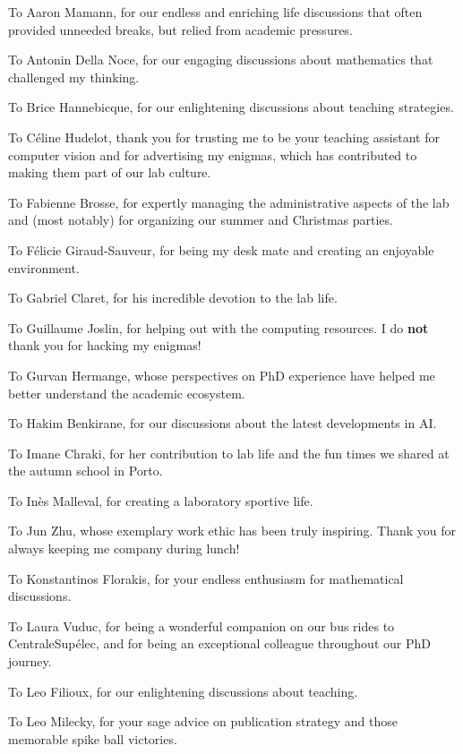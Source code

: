 To Aaron Mamann, for our endless and enriching life discussions that often provided unneeded breaks, but relied from academic pressures.


To Antonin Della Noce, for our engaging discussions about mathematics that challenged my thinking.

To Brice Hannebicque, for our enlightening discussions about teaching strategies.

To Céline Hudelot, thank you for trusting me to be your teaching assistant for computer vision and for advertising my enigmas, which has contributed to making them part of our lab culture.

To Fabienne Brosse, for expertly managing the administrative aspects of the lab and (most notably) for organizing our summer and Christmas parties.

To Félicie Giraud-Sauveur, for being my desk mate and creating an enjoyable environment.

To Gabriel Claret, for his incredible devotion to the lab life.

To Guillaume Joslin, for helping out with the computing resources.
I do \textbf{not} thank you for hacking my enigmas!

To Gurvan Hermange, whose perspectives on PhD experience have helped me better understand the academic ecosystem.

To Hakim Benkirane, for our discussions about the latest developments in AI.

To Imane Chraki, for her contribution to lab life and the fun times we shared at the autumn school in Porto.

To Inès Malleval, for creating a laboratory sportive life.

To Jun Zhu, whose exemplary work ethic has been truly inspiring.
Thank you for always keeping me company during lunch!

To Konstantinos Florakis, for your endless enthusiasm for mathematical discussions.

To Laura Vuduc, for being a wonderful companion on our bus rides to CentraleSupélec, and for being an exceptional colleague throughout our PhD journey.

To Leo Filioux, for our enlightening discussions about teaching.

To Leo Milecky, for your sage advice on publication strategy and those memorable spike ball victories.

